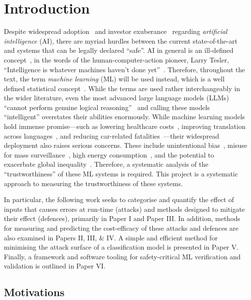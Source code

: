 \chapter{Introduction}


Despite widespread adoption~\cite{ai_automotive,ai_aviation,ai_luggage,ai_prison,ai_security} and investor exuberance~\cite{mou2019artificial} regarding \textit{artificial intelligence} (AI), there are myriad hurdles between the current state-of-the-art and systems that can be legally declared ``safe''. 
AI in general is an ill-defined concept~\cite{phillips1999if}, in the words of the human-computer-action pioneer, Larry Tesler, ``Intelligence is whatever machines haven't done yet''~\cite{hofstadter1999godel}.
Therefore, throughout the text, the term \textit{machine learning} (ML) will be used instead, which is a well defined statistical concept~\cite{shalev2014understanding}.
While the terms are used rather interchangeably in the wider literature, even the most advanced large language models (LLMs) ``cannot perform genuine logical reasoning''~\cite{gsm-symbolic} and calling these models ``intelligent'' overstates their abilities enormously.
While machine learning models hold immense promise—such as lowering healthcare costs~\cite{ai_medical_imaging}, improving translation across languages~\cite{ai_translation}, and reducing car-related fatalities~\cite{ai_automotive_safety}—their widespread deployment also raises serious concerns. These include unintentional bias~\cite{buolamwini2018gender}, misuse for mass surveillance~\cite{abelson2021bugs}, high energy consumption~\cite{ai_power}, and the potential to exacerbate global inequality~\cite{ai_inequity}.
Therefore, a systematic analysis of the ``trustworthiness'' of these ML systems is required.
This project is a systematic approach to measuring the trustworthiness of these systems.

In particular, the following work seeks to categorise and quantify the effect of inputs that causes errors at run-time (attacks) and methods designed to mitigate their effect (defences), primarily in Paper I and Paper III\@.
In addition, methods for measuring and predicting the cost-efficacy of these attacks and defences are also examined in Papers II, III, \& IV\@.
A simple and efficient method for minimising the attack surface of a classification model is presented in Paper V\@.
Finally, a framework and software tooling for safety-critical ML verification and validation is outlined in Paper VI\@.

\section{Motivations}
\label{sec:motivations}

